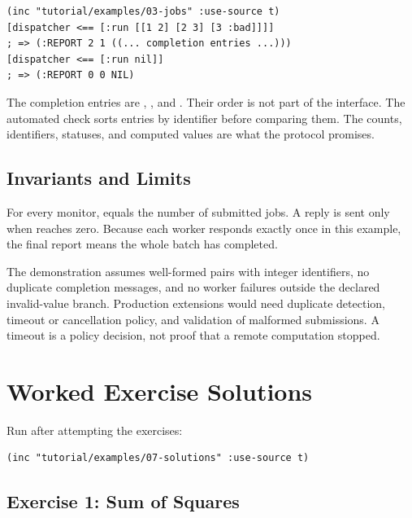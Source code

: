 \begin{codeblock}
\begin{lstlisting}
(inc "tutorial/examples/03-jobs" :use-source t)
[dispatcher <== [:run [[1 2] [2 3] [3 :bad]]]]
; => (:REPORT 2 1 ((... completion entries ...)))
[dispatcher <== [:run nil]]
; => (:REPORT 0 0 NIL)
\end{lstlisting}
\end{codeblock}

The completion entries are , , and
. Their order is not part of the interface.
The automated check sorts entries by identifier before comparing them.
The counts, identifiers, statuses, and computed values are what the
protocol promises.

\subsection{Invariants and Limits}

For every monitor,  equals the
number of submitted jobs. A reply is sent only when 
reaches zero. Because each worker responds exactly once in this example,
the final report means the whole batch has completed.

The demonstration assumes well-formed pairs with integer identifiers,
no duplicate completion messages, and no worker failures outside the
declared invalid-value branch. Production extensions would need
duplicate detection, timeout or cancellation policy, and validation
of malformed submissions. A timeout is a policy decision, not proof
that a remote computation stopped.

\section{Worked Exercise Solutions}

Run  after attempting the exercises:

\begin{lstlisting}
(inc "tutorial/examples/07-solutions" :use-source t)
\end{lstlisting}

\subsection{Exercise 1: Sum of Squares}
\label{sol:squares}


